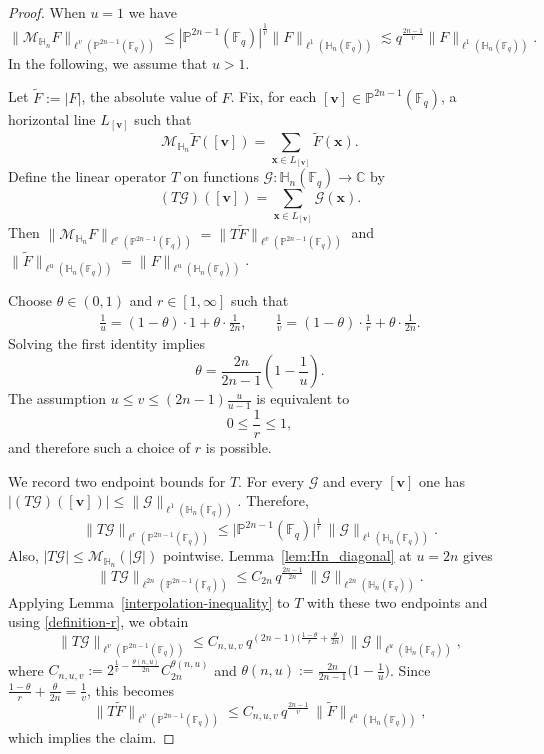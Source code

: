 \documentclass[11pt]{article}
\newcommand{\F}{\mathbb{F}}
\newcommand{\1}{\mathbf 1}
\newcommand{\bfv}{\mathbf{v}}
\begin{document}
\begin{proof}
When $u=1$ we have 
\[
\|\mathcal{M}_{\mathbb{H}_n}F\|_{\ell^v(\mathbb{P}^{2n-1}(\mathbb{F}_q))}\leq |\mathbb P^{2n-1}(\F_q)|^{\frac{1}{v}}\|F\|_{\ell^1(\mathbb H_n(\F_q))}\lesssim q^{\frac{2n-1}{v}}\|F\|_{\ell^1(\mathbb H_n(\F_q))}.
\]
In the following, we assume that $u>1$. 

Let $\widetilde{F}:=|F|$, the absolute value of $F$. Fix, for each $[\mathbf{v}]\in \mathbb{P}^{2n-1}(\mathbb{F}_q)$, a horizontal line $L_{[\bfv]}$ such that
\[
\mathcal{M}_{\mathbb{H}_n} \widetilde{F}([\mathbf{v}])=\sum_{\mathbf{x}\in L_{[\mathbf{v}]}} \widetilde{F}(\mathbf{x}).
\]
Define the linear operator $T$ on functions $\mathcal G:\mathbb{H}_n(\mathbb{F}_q)\to\mathbb{C}$ by
\[
(T \mathcal G)([\mathbf{v}])=\sum_{\mathbf x\in L_{[\mathbf{v}]}} \mathcal G(\mathbf x).
\]
Then $\|\mathcal{M}_{\mathbb{H}_n}F\|_{\ell^v(\mathbb{P}^{2n-1}(\mathbb{F}_q))}=\|T \widetilde{F}\|_{\ell^v(\mathbb{P}^{2n-1}(\mathbb{F}_q))}$ and $\|\widetilde{F}\|_{\ell^u(\mathbb{H}_n(\mathbb{F}_q))}=\|F\|_{\ell^u(\mathbb{H}_n(\mathbb{F}_q))}$.


Choose $\theta\in(0,1)$ and $r\in[1,\infty]$ such that
\begin{align}\label{definition-r}
    \frac{1}{u} = (1-\theta)\cdot 1 + \theta \cdot \frac{1}{2n},
\qquad
\frac{1}{v} = (1-\theta)\cdot \frac{1}{r} + \theta \cdot \frac{1}{2n}.
\end{align}
Solving the first identity implies
\[
\theta = \frac{2n}{2n-1}\left(1-\frac{1}{u}\right).
\]
The assumption $u \le v \le (2n-1)\frac{u}{u-1}$ is equivalent to
\[
0 \le \frac{1}{r} \le 1,
\]
and therefore such a choice of $r$ is possible.

We record two endpoint bounds for $T$.
For every $\mathcal G$ and every $[\mathbf{v}]$ one has $|(T\mathcal G)([\mathbf{v}])|\le \|\mathcal G\|_{\ell^1(\mathbb{H}_n(\mathbb{F}_q))}$.
Therefore,
\[
\|T\mathcal G\|_{\ell^r(\mathbb{P}^{2n-1}(\mathbb{F}_q))}
\le
\bigl|\mathbb{P}^{2n-1}(\mathbb{F}_q)\bigr|^{\frac{1}{r}}\, \|\mathcal  G\|_{\ell^1(\mathbb{H}_n(\mathbb{F}_q))}.
\]
Also, $|T \mathcal G|\le \mathcal{M}_{\mathbb{H}_n}(|\mathcal G|)$ pointwise.
Lemma~\ref{lem:Hn_diagonal} at $u=2n$ gives
\[
\|T\mathcal G\|_{\ell^{2n}(\mathbb{P}^{2n-1}(\mathbb{F}_q))}
\le
C_{2n}\, q^{\frac{2n-1}{2n}}\, \|\mathcal G\|_{\ell^{2n}(\mathbb{H}_n(\mathbb{F}_q))}.
\]
Applying Lemma~\ref{interpolation-inequality} to $T$ with these two endpoints and using \eqref{definition-r}, we obtain
\[
\|T\mathcal G\|_{\ell^v(\mathbb{P}^{2n-1}(\mathbb{F}_q))}
\le
C_{n,u,v}\,
q^{(2n-1)\bigl(\frac{1-\theta}{r}+\frac{\theta}{2n}\bigr)}\,
\|\mathcal G\|_{\ell^u(\mathbb{H}_n(\mathbb{F}_q))},
\]
where $C_{n,u,v}:=2^{\frac{1}{v}-\frac{\theta(n, u)}{2n}} C_{2n}^{\theta(n, u)}$ and $\theta(n, u):=\frac{2n}{2n-1} \big(1-\frac{1}{u}\big)$.
Since $\frac{1-\theta}{r}+\frac{\theta}{2n}=\frac{1}{v}$, this becomes
\[
\|T \widetilde{F}\|_{\ell^v(\mathbb{P}^{2n-1}(\mathbb{F}_q))}
\le
C_{n,u,v}\, q^{\frac{2n-1}{v}}\, \|\widetilde{F} \|_{\ell^u(\mathbb{H}_n(\mathbb{F}_q))},
\]
which implies the claim.
\end{proof}
\end{document}
